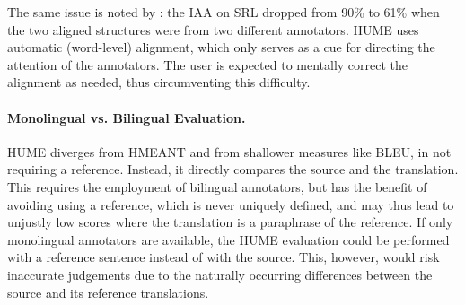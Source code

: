 \documentclass[11pt,letterpaper]{article}
\newcommand{\com}[1]{}
\newcommand{\oa}[1]{\footnote{\color{red}OA: #1}}
\newcommand{\bh}[1]{\footnote{\color{blue}BH: #1}}
\def\perscite#1{\newcite{#1}}
\begin{document}
The same issue is noted by \perscite{lo:wu:reliability:2014}:
the IAA on SRL dropped from 90\% to 61\% 
when the two aligned structures were from two different annotators.
HUME uses automatic (word-level) alignment, which only
serves as a cue for directing the attention of the annotators.
The user is expected to mentally correct the
alignment as needed, thus circumventing this difficulty.





\paragraph{Monolingual vs. Bilingual Evaluation.}
\label{src-vs-ref}
HUME diverges from HMEANT and from shallower measures
like BLEU, in not requiring a reference.
Instead, it directly compares the source and the translation.
This requires the employment of bilingual annotators, but has the benefit of avoiding
using a reference, which is never uniquely defined, and may thus 
lead to unjustly low scores where the translation is a paraphrase of the reference.
If only monolingual annotators are available, the HUME evaluation could be performed
with a reference sentence instead of with the source. This, however,
would risk inaccurate judgements due to the naturally occurring differences
between the source and its reference translations.




\com{
\paragraph{Error Localisation.}
In HMEANT, an error in a child node often results in the parent node
being penalised as well. This makes it harder to quantify the true scale of  
the original error, as its effect gets propagated up the tree. 
In HUME, errors are localised as much as possible to where they occur,
by the separation of atomic and structural units,
which supports a more accurate aggregation of the translation errors
to a composite score.
}
\end{document}
